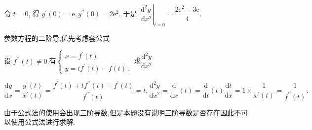 \documentclass[8pt a4paper, oneside, UTF8]{ctexbook}  %
\begin{document}
\begin{sloppypar}
\begin{solution}
$$        $$
        令 $t=0$, 得 $y^{\prime}(0)=\mathrm{e}, y^{\prime \prime}(0)=2 \mathrm{e}^2$. 于是 $\left.\dfrac{\mathrm{d}^2 y}{\mathrm{~d} x^2}\right|_{t=0}=\dfrac{2 \mathrm{e}^2-3 \mathrm{e}}{4}$.
    \end{solution}
    \begin{note}
        参数方程的二阶导,优先考虑套公式
    \end{note}
    \begin{problem}
    设 $f^{\prime\prime}(t)\neq0$,有$\begin{cases}x=f^{\prime}(t)\:\\y=tf^{\prime}(t)-f(t)\:,\end{cases}$求$\dfrac{\mathrm{d}^2y}{\mathrm{d}x^2}$
    \end{problem}
    \begin{solution}
        $\dfrac{\mathrm{d}y}{\mathrm{d}x}=\dfrac{y^{\prime}(t)}{x^{\prime}(t)}=\dfrac{f^{\prime}(t)+tf^{\prime\prime}(t)-f^{\prime}(t)}{f^{\prime\prime}(t)}=t ,\dfrac{\mathrm{d}^{2}y}{\mathrm{d}x^{2}}=\dfrac{\mathrm{d}}{\mathrm{d}x}(t)=\dfrac{\mathrm{d}}{\mathrm{d}t}(t) \dfrac{\mathrm{d}t}{\mathrm{d}x}=1\times\dfrac{1}{x^{\prime}(t)}=\dfrac{1}{f^{\prime\prime}(t)}.$
    \end{solution}
    \begin{note}
        由于公式法的使用会出现三阶导数,但是本题没有说明三阶导数是否存在因此不可以使用公式法进行求解.
    \end{note}

\end{sloppypar}
\end{document}
